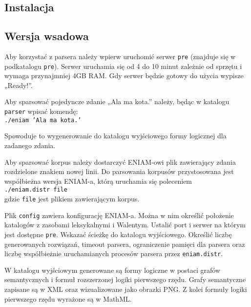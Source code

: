 \documentclass[oneside,pwrcover,withmarginpar,hidelinks,11pt]{article}
\begin{document}
\subsection{Instalacja}


\subsection{Wersja wsadowa}%

Aby korzystać z parsera należy wpierw uruchomić serwer {\tt pre}
(znajduje się w podkatalogu {\tt pre}).
Serwer uruchamia się od 4 do 10 minut zależnie od sprzętu i
wymaga przynajmniej 4GB RAM.
Gdy serwer będzie gotowy do użycia wypisze „Ready!”.

Aby sparsować pojedyncze zdanie „Ala ma kota.” należy, będąc w katalogu {\tt parser}
wpisać komendę:\\
{\tt ./eniam 'Ala ma kota.'}

Spowoduje to wygenerowanie do katalogu wyjściowego formy logicznej dla zadanego zdania.

Aby sparsować korpus należy dostarczyć ENIAM-owi plik zawierający
zdania rozdzielone znakiem nowej linii. Do parsowania korpusów 
przystosowana jest współbieżna wersja ENIAM-a, którą uruchamia się poleceniem\\
{\tt ./eniam.distr file}\\
gdzie {\tt file} jest plikiem zawierającym korpus.

Plik {\tt config} zawiera konfigurację ENIAM-a.
Można w nim określić położenie katalogów z zasobami leksykalnymi i Walentym.
Ustalić port i serwer na którym jest dostępne {\tt pre}.
Wskazać ścieżkę do katalogu wyjściowego.
Określić liczbę generowanych rozwiązań, timeout parsera, ograniczenie pamięci dla parsera
oraz liczbę współbieżnie uruchamianych procesów parsera przez {\tt eniam.distr}.

W katalogu wyjściowym generowane są formy logiczne 
w postaci grafów semantycznych i formuł rozszerzonej logiki pierwszego rzędu.
Grafy semantyczne zapisane są w XML oraz wizualizowane jako obrazki PNG. 
Z kolei formuły logiki pierwszego rzędu wyrażone są w MathML.

\end{document}
